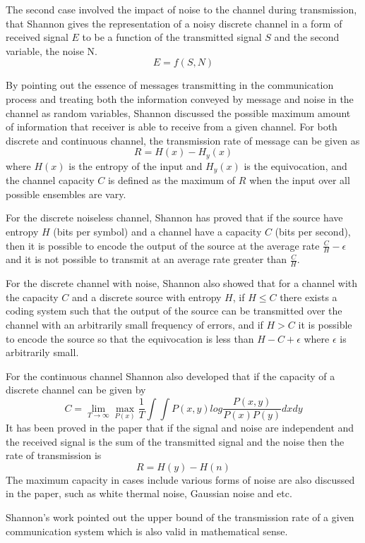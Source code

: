\documentclass[12pt]{article}
\begin{document}
		The second case involved the impact of noise  to the channel during transmission, that Shannon gives the representation of a noisy discrete channel in a form of received signal $E$ to be a function of the transmitted signal $S$ and the second variable, the noise N. $$E = f(S, N)$$ \par 
		By pointing out the essence of messages transmitting in the communication process and treating both the information conveyed by message and noise in the channel as random variables, Shannon discussed the possible maximum amount of information that receiver is able to receive from a given channel. For both discrete and continuous channel, the transmission rate of message can be given as $$R = H(x) - H_y(x)$$ where $H(x)$ is the entropy of the input and $H_y(x)$ is the equivocation, and the channel capacity $C$ is defined as the maximum of $R$ when the input over all possible ensembles are vary. \par 
		For the discrete noiseless channel, Shannon has proved that if the source have entropy $H$ (bits per symbol) and a channel have a capacity $C$ (bits per second), then it is possible to encode the output of the source at the average rate $\frac{C}{H} - \epsilon$ and it is not possible to transmit at an average rate greater than $\frac{C}{H}$. \par 
		For the discrete channel with noise, Shannon also showed that for a channel with the capacity $C$ and a discrete source with entropy $H$, if $H \leq C$ there exists a coding system such that the output of the source can be transmitted over the channel with an arbitrarily small frequency of errors, and if $H > C$ it is possible to encode the source so that the equivocation is less than $H - C + \epsilon$ where $\epsilon$ is arbitrarily small. \par 
		For the continuous channel Shannon also developed that if the capacity of a discrete channel can be given by $$C = \lim_{T\to\infty}\max_{P(x)}\frac{1}{T}\int\int P(x,y)log{\frac{P(x,y)}{P(x)P(y)}}dxdy$$ It has been proved in the paper that if the signal and noise are independent and the received signal is the sum of the transmitted signal and the noise then the rate of transmission is $$R = H(y) - H(n)$$ The maximum capacity in cases include various forms of noise are also discussed in the paper, such as white thermal noise, Gaussian noise and etc. \par 
		Shannon's work pointed out the upper bound of the transmission rate of a given communication system which is also valid in mathematical sense. \par
		
\end{document}

